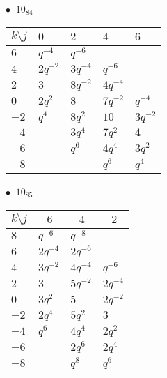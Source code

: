 \begin{minipage}{\linewidth}
$\bullet\ $ $10_{84}$ \vspace{0.5em} \\
\begin{tabular}{l|llll}
$k \setminus j$ & $0$ & $2$ & $4$ & $6$ \\
\hline
$6$ & $q^{-4}$ & $q^{-6}$ &  &  \\
$4$ & $2q^{-2}$ & $3q^{-4}$ & $q^{-6}$ &  \\
$2$ & $3$ & $8q^{-2}$ & $4q^{-4}$ &  \\
$0$ & $2q^{2}$ & $8$ & $7q^{-2}$ & $q^{-4}$ \\
$-2$ & $q^{4}$ & $8q^{2}$ & $10$ & $3q^{-2}$ \\
$-4$ &  & $3q^{4}$ & $7q^{2}$ & $4$ \\
$-6$ &  & $q^{6}$ & $4q^{4}$ & $3q^{2}$ \\
$-8$ &  &  & $q^{6}$ & $q^{4}$ \\
\end{tabular}
\vspace{2em}
\end{minipage}
%
\begin{minipage}{\linewidth}
$\bullet\ $ $10_{85}$ \vspace{0.5em} \\
\begin{tabular}{l|lll}
$k \setminus j$ & $-6$ & $-4$ & $-2$ \\
\hline
$8$ & $q^{-6}$ & $q^{-8}$ &  \\
$6$ & $2q^{-4}$ & $2q^{-6}$ &  \\
$4$ & $3q^{-2}$ & $4q^{-4}$ & $q^{-6}$ \\
$2$ & $3$ & $5q^{-2}$ & $2q^{-4}$ \\
$0$ & $3q^{2}$ & $5$ & $2q^{-2}$ \\
$-2$ & $2q^{4}$ & $5q^{2}$ & $3$ \\
$-4$ & $q^{6}$ & $4q^{4}$ & $2q^{2}$ \\
$-6$ &  & $2q^{6}$ & $2q^{4}$ \\
$-8$ &  & $q^{8}$ & $q^{6}$ \\
\end{tabular}
\vspace{2em}
\end{minipage}
%
